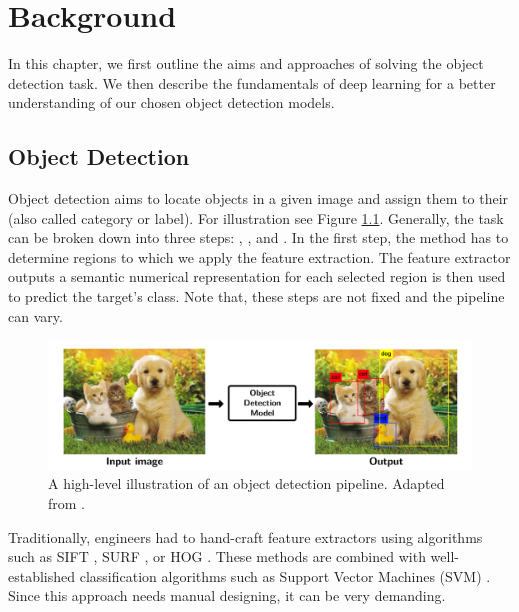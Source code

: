\chapter{Background}
In this chapter, we first outline the aims and approaches of solving the object detection task. We then describe the fundamentals of deep learning for a better understanding of our chosen object detection models.

\section{Object Detection}

Object detection aims to locate objects in a given image and assign them to their  (also called category or label). For illustration see Figure \ref{fig:od}. Generally, the task can be broken down into three steps: , , and . In the first step, the method has to determine regions to which we apply the feature extraction. The feature extractor outputs a semantic numerical representation for each selected region is then used to predict the target's class. Note that, these steps are not fixed and the pipeline can vary.

\begin{figure}[h]
    \centering
    \includegraphics[width=0.9\linewidth]{Sources/Figures/objectdetection.png}
    \caption{A high-level illustration of an object detection pipeline. Adapted from \cite{objectdetectionfigure}.}
    \label{fig:od}
\end{figure}

Traditionally, engineers had to hand-craft feature extractors using algorithms such as SIFT \cite{sift}, SURF \cite{surf}, or HOG \cite{hog}. These methods are combined with well-established classification algorithms such as Support Vector Machines (SVM) \cite{svm}. Since this approach needs manual designing, it can be very demanding.

